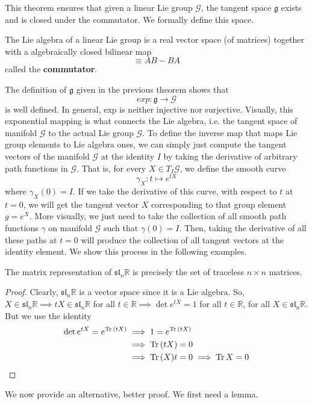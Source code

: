   This theorem ensures that given a linear Lie group $\mathcal{G}$, the tangent space $\mathfrak{g}$ exists and is closed under the commutator. We formally define this space. 

  \begin{definition}
    The Lie algebra of a linear Lie group is a real vector space (of matrices) together with a algebraically closed bilinear map 
    \begin{equation}
      [A,B] \equiv A B - B A
    \end{equation}
    called the \textbf{commutator}. 
  \end{definition} 

  The definition of $\mathfrak{g}$ given in the previous theorem shows that 
  \begin{equation}
    exp: \mathfrak{g} \rightarrow \mathcal{G}
  \end{equation}
  is well defined. In general, exp is neither injective nor surjective. Visually, this exponential mapping is what connects the Lie algebra, i.e. the tangent space of manifold $\mathcal{G}$ to the actual Lie group $\mathcal{G}$. To define the inverse map that maps Lie group elements to Lie algebra ones, we can simply just compute the tangent vectors of the manifold $\mathcal{G}$ at the identity $I$ by taking the derivative of arbitrary path functions in $\mathcal{G}$. That is, for every $X \in T_I \mathcal{G}$, we define the smooth curve 
  \begin{equation}
    \gamma_X: t \mapsto e^{tX}
  \end{equation}
  where $\gamma_X(0) = I$. If we take the derivative of this curve, with respect to $t$ at $t = 0$, we will get the tangent vector $X$ corresponding to that group element $g = e^{X}$. More visually, we just need to take the collection of all smooth path functions $\gamma$ on manifold $\mathcal{G}$ such that $\gamma(0) = I$. Then, taking the derivative of all these paths at $t = 0$ will produce the collection of all tangent vectors at the identity element. We show this process in the following examples. 

  \begin{theorem}
    The matrix representation of $\mathfrak{sl}_n \mathbb{R}$ is precisely the set of traceless $n \times n$ matrices. 
  \end{theorem}

  \begin{proof}
    Clearly, $\mathfrak{sl}_n \mathbb{R}$ is a vector space since it is a Lie algebra. So, $X \in \mathfrak{sl}_n \mathbb{R} \implies t X \in \mathfrak{sl}_n \mathbb{R}$ for all $t \in \mathbb{R} \implies \det{e^{tX}} = 1$ for all $t \in \mathbb{R}$, for all $X \in \mathfrak{sl}_n \mathbb{R}$. But we use the identity 
    \begin{align*}
      \det{e^{tX}} = e^{\operatorname{Tr}{(tX)}} & \implies 1 = e^{\operatorname{Tr}{(t X)}} \\
      & \implies \operatorname{Tr}{(tX)} = 0 \\
      & \implies \operatorname{Tr}{(X)} t = 0 \implies \operatorname{Tr}{X} = 0
    \end{align*}
  \end{proof}
  We now provide an alternative, better proof. We first need a lemma. 

